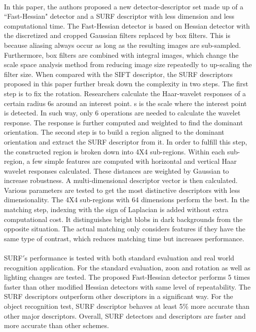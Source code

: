\documentclass[11pt, oneside]{article}   	%
\begin{document}
\paragraph{}In this paper, the authors proposed a new detector-descriptor set made up of a ``Fast-Hessian" detector and a SURF descriptor with less dimension and less computational time. The Fast-Hessian detector is based on Hessian detector with the discretized and cropped Gaussian filters replaced by box filters. This is because aliasing always occur as long as the resulting images are sub-sampled. Furthermore, box filters are combined with integral images, which change the scale space analysis method from reducing image size repeatedly to up-scaling the filter size. When compared with the SIFT descriptor, the SURF descriptors proposed in this paper further break down the complexity in two steps. The first step is to fix the rotation. Researchers calculate the Haar-wavelet responses of a certain radius 6s around an interest point. s is the scale where the interest point is detected. In such way, only 6 operations are needed to calculate the wavelet response. The response is further computed and weighted to find the dominant orientation. The second step is to build a region aligned to the dominant orientation and extract the SURF descriptor from it. In order to fulfill this step, the constructed region is broken down into 4X4 sub-regions. Within each sub-region, a few simple features are computed with horizontal and vertical Haar wavelet responses calculated. These distances are weighted by Gaussian to increase robustness. A multi-dimensional descriptor vector is then calculated. Various parameters are tested to get the most distinctive descriptors with less dimensionality. The 4X4 sub-regions with 64 dimensions perform the best. In the matching step, indexing with the sign of Laplacian is added without extra computational cost. It distinguishes bright blobs in dark backgrounds from the opposite situation. The actual matching only considers features if they have the same type of contrast, which reduces matching time but increases performance.
\paragraph{}SURF$'$s performance is tested with both standard evaluation and real world recognition application. For the standard evaluation, zoon and rotation as well as lighting changes are tested. The proposed Fast-Hessian detector performs 5 times faster than other modified Hessian detectors with same level of repeatability. The SURF descriptors outperform other descriptors in a significant way. For the object recognition test, SURF descriptor behaves at least 5\% more accurate than other major descriptors. Overall, SURF detectors and descriptors are faster and more accurate than other schemes.  
\end{document}
